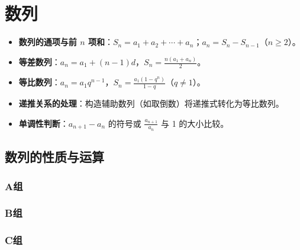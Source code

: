 \chapter{数列}

\begin{knowledgeframe}
\begin{itemize}
	\item \textbf{数列的通项与前 $n$ 项和}：$S_n = a_1 + a_2 + \cdots + a_n$；$a_n = S_n - S_{n-1}$（$n \ge 2$）。
	\item \textbf{等差数列}：$a_n = a_1 + (n-1)d$，$S_n = \frac{n(a_1+a_n)}{2}$。
	\item \textbf{等比数列}：$a_n = a_1 q^{n-1}$，$S_n = \frac{a_1(1-q^n)}{1-q}$（$q \ne 1$）。
	\item \textbf{递推关系的处理}：构造辅助数列（如取倒数）将递推式转化为等比数列。
	\item \textbf{单调性判断}：$a_{n+1}-a_n$ 的符号或 $\frac{a_{n+1}}{a_n}$ 与 1 的大小比较。
\end{itemize}
\end{knowledgeframe}

\section{数列的性质与运算}

\startexercise

\subsection*{A组}



\subsection*{B组}



\subsection*{C组}



\stopexercise
